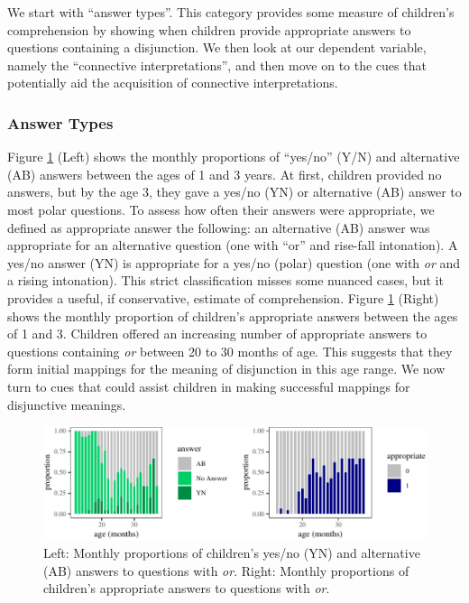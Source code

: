 \documentclass[
  ,man,floatsintext]{apa6}
\begin{document}
We start with ``answer types''. This category provides some measure of children's comprehension by showing when children provide appropriate answers to questions containing a disjunction. We then look at our dependent variable, namely the ``connective interpretations'', and then move on to the cues that potentially aid the acquisition of connective interpretations.

\hypertarget{answer-types}{%
\subsubsection{Answer Types}\label{answer-types}}

Figure \ref{fig:answerPlot} (Left) shows the monthly proportions of ``yes/no'' (Y/N) and alternative (AB) answers between the ages of 1 and 3 years. At first, children provided no answers, but by the age 3, they gave a yes/no (YN) or alternative (AB) answer to most polar questions. To assess how often their answers were appropriate, we defined as appropriate answer the following: an alternative (AB) answer was appropriate for an alternative question (one with ``or'' and rise-fall intonation). A yes/no answer (YN) is appropriate for a yes/no (polar) question (one with \emph{or} and a rising intonation). This strict classification misses some nuanced cases, but it provides a useful, if conservative, estimate of comprehension. Figure \ref{fig:answerPlot} (Right) shows the monthly proportion of children's appropriate answers between the ages of 1 and 3. Children offered an increasing number of appropriate answers to questions containing \emph{or} between 20 to 30 months of age. This suggests that they form initial mappings for the meaning of disjunction in this age range. We now turn to cues that could assist children in making successful mappings for disjunctive meanings.

\begin{figure}[H]

{\centering \includegraphics{figs/answerPlot-1} 

}

\caption{Left: Monthly proportions of children's yes/no (YN) and alternative (AB) answers to questions with \textit{or}. Right: Monthly proportions of children's appropriate answers to questions with \textit{or}.}\label{fig:answerPlot}
\end{figure}
\end{document}
